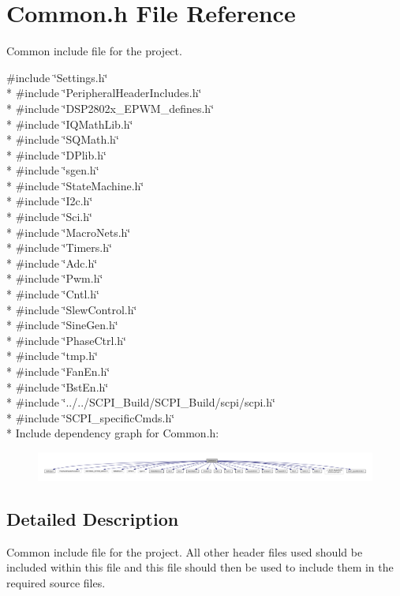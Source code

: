 \hypertarget{a00011}{\section{Common.\-h File Reference}
\label{a00011}
}


Common include file for the project.  


{\ttfamily \#include \char`\"{}Settings.\-h\char`\"{}}\\*
{\ttfamily \#include \char`\"{}Peripheral\-Header\-Includes.\-h\char`\"{}}\\*
{\ttfamily \#include \char`\"{}D\-S\-P2802x\-\_\-\-E\-P\-W\-M\-\_\-defines.\-h\char`\"{}}\\*
{\ttfamily \#include \char`\"{}I\-Q\-Math\-Lib.\-h\char`\"{}}\\*
{\ttfamily \#include \char`\"{}S\-Q\-Math.\-h\char`\"{}}\\*
{\ttfamily \#include \char`\"{}D\-Plib.\-h\char`\"{}}\\*
{\ttfamily \#include \char`\"{}sgen.\-h\char`\"{}}\\*
{\ttfamily \#include \char`\"{}State\-Machine.\-h\char`\"{}}\\*
{\ttfamily \#include \char`\"{}I2c.\-h\char`\"{}}\\*
{\ttfamily \#include \char`\"{}Sci.\-h\char`\"{}}\\*
{\ttfamily \#include \char`\"{}Macro\-Nets.\-h\char`\"{}}\\*
{\ttfamily \#include \char`\"{}Timers.\-h\char`\"{}}\\*
{\ttfamily \#include \char`\"{}Adc.\-h\char`\"{}}\\*
{\ttfamily \#include \char`\"{}Pwm.\-h\char`\"{}}\\*
{\ttfamily \#include \char`\"{}Cntl.\-h\char`\"{}}\\*
{\ttfamily \#include \char`\"{}Slew\-Control.\-h\char`\"{}}\\*
{\ttfamily \#include \char`\"{}Sine\-Gen.\-h\char`\"{}}\\*
{\ttfamily \#include \char`\"{}Phase\-Ctrl.\-h\char`\"{}}\\*
{\ttfamily \#include \char`\"{}tmp.\-h\char`\"{}}\\*
{\ttfamily \#include \char`\"{}Fan\-En.\-h\char`\"{}}\\*
{\ttfamily \#include \char`\"{}Bst\-En.\-h\char`\"{}}\\*
{\ttfamily \#include \char`\"{}../../\-S\-C\-P\-I\-\_\-\-Build/\-S\-C\-P\-I\-\_\-\-Build/scpi/scpi.\-h\char`\"{}}\\*
{\ttfamily \#include \char`\"{}S\-C\-P\-I\-\_\-specific\-Cmds.\-h\char`\"{}}\\*
Include dependency graph for Common.\-h\-:\nopagebreak
\begin{figure}[H]
\begin{center}
\leavevmode
\includegraphics[width=350pt]{a00047}
\end{center}
\end{figure}


\subsection{Detailed Description}
Common include file for the project. All other header files used should be included within this file and this file should then be used to include them in the required source files. 